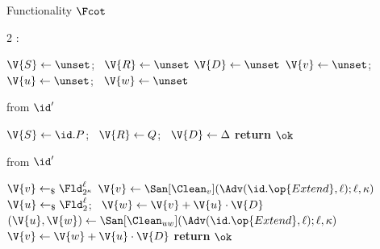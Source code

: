 \begin{interface}[nofloat]{Functionality $\Fcot$ \\
\params{$\PID$, \quad $\Ps$, \quad $\admits$, \quad
$\uses := \{(\Adv,\serves)\}$, \quad $\pars := \kappa$}}

{\scriptsize
\setlength{\columnsep}{1.4em}
\begin{multicols}{2}
:
\begin{algorithmic}[1]
\setcounter{contline}{0}\algcont
\State $\V{S} \gets \unset$; \ $\V{R} \gets \unset$
\State $\V{D} \gets \unset$
\State $\V{v} \gets \unset$; \ $\V{u} \gets \unset$; \ $\V{w} \gets \unset$
\algsave
\end{algorithmic}
\vspace{1.4ex}

 \quad from $\id'$
\begin{algorithmic}[1]
\algcont
{} \label{ln:cotoneinit}
\State $\V{S} \gets \id.P$; \ $\V{R} \gets Q$; \ $\V{D} \gets \Delta$
\State \textbf{return} $\ok$
\algsave
\end{algorithmic}
\vspace{1.4ex}

 \quad from $\id'$
\begin{algorithmic}[1]
\algcont
{}
\State $\V{v} \gets_{\$} \Fld_{2^{\kappa}}^{\ell}$ \label{ln:cotdrawv}
  \State $\V{v} \gets \San[\Clean_{v}](\Adv(\id.\op{Extend}, \ell); \ell, \kappa)$ \label{ln:cotsenderchoice}
\EndIf
\State $\V{u} \gets_{\$} \Fld_{2}^{\ell}$; \ $\V{w} \gets \V{v} + \V{u} \cdot \V{D}$ \label{ln:cotcorrelation}
  \State $(\V{u}, \V{w}) \gets \San[\Clean_{uw}](\Adv(\id.\op{Extend}, \ell); \ell, \kappa)$
  \State $\V{v} \gets \V{w} + \V{u} \cdot \V{D}$ \label{ln:cotrecompute}
\EndIf
\State \textbf{return} $\ok$
\algsave
\end{algorithmic}
\vspace{1.4ex}


\end{multicols}}
\end{interface}
